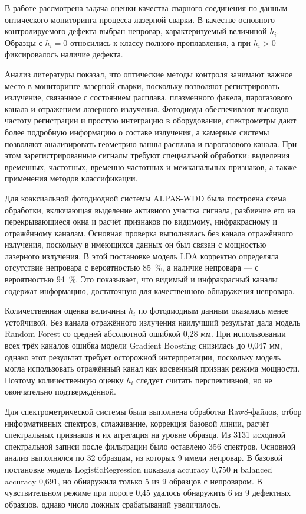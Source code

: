 \startconclusionpage

В работе рассмотрена задача оценки качества сварного соединения по данным оптического мониторинга процесса лазерной сварки. В качестве основного контролируемого дефекта выбран непровар, характеризуемый величиной \(h_i\). Образцы с \(h_i = 0\) относились к классу полного проплавления, а при \(h_i > 0\) фиксировалось наличие дефекта.

Анализ литературы показал, что оптические методы контроля занимают важное место в мониторинге лазерной сварки, поскольку позволяют регистрировать излучение, связанное с состоянием расплава, плазменного факела, парогазового канала и отражением лазерного излучения. Фотодиоды обеспечивают высокую частоту регистрации и простую интеграцию в оборудование, спектрометры дают более подробную информацию о составе излучения, а камерные системы позволяют анализировать геометрию ванны расплава и парогазового канала. При этом зарегистрированные сигналы требуют специальной обработки: выделения временных, частотных, временно-частотных и межканальных признаков, а также применения методов классификации.

Для коаксиальной фотодиодной системы ALPAS-WDD была построена схема обработки, включающая выделение активного участка сигнала, разбиение его на перекрывающиеся окна и расчёт признаков по видимому, инфракрасному и отражённому каналам. Основная проверка выполнялась без канала отражённого излучения, поскольку в имеющихся данных он был связан с мощностью лазерного излучения. В этой постановке модель LDA корректно определяла отсутствие непровара с вероятностью 85~\%, а наличие непровара --- с вероятностью 94~\%. Это показывает, что видимый и инфракрасный каналы содержат информацию, достаточную для качественного обнаружения непровара.

Количественная оценка величины $h_i$ по фотодиодным данным оказалась менее устойчивой. Без канала отражённого излучения наилучший результат дала модель Random Forest со средней абсолютной ошибкой 0,28 мм. При использовании всех трёх каналов ошибка модели Gradient Boosting снизилась до 0,047 мм, однако этот результат требует осторожной интерпретации, поскольку модель могла использовать отражённый канал как косвенный признак режима мощности. Поэтому количественную оценку $h_i$ следует считать перспективной, но не окончательно подтверждённой.

Для спектрометрической системы была выполнена обработка Raw8-файлов, отбор информативных спектров, сглаживание, коррекция базовой линии, расчёт спектральных признаков и их агрегация на уровне образца. Из 3131 исходной спектральной записи после фильтрации было оставлено 356 спектров. Основной анализ выполнялся по 32 образцам, из которых 9 имели непровар. В базовой постановке модель LogisticRegression показала accuracy 0,750 и balanced accuracy 0,691, но обнаружила только 5 из 9 образцов с непроваром. В чувствительном режиме при пороге 0,45 удалось обнаружить 6 из 9 дефектных образцов, однако число ложных срабатываний увеличилось.

